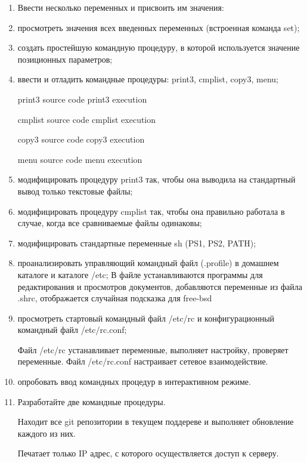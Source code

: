 \documentclass[a4paper,14pt]{article}
\begin{document}


\begin{enumerate}
\item Ввести несколько переменных и присвоить им значения:
	{\small }
\item просмотреть значения всех введенных переменных (встроенная команда set);
	{\small }
\item создать простейшую командную процедуру, в которой используется значение позиционных параметров;
	{\small }
\item ввести и отладить командные процедуры: print3, cmplist, copy3, menu;

	print3 source code
	{\small }
	print3 execution
	{\small }
	
	cmplist source code
	{\small }
	cmplist execution
	{\small }
	
	copy3 source code
	{\small }
	copy3 execution
	{\small }
	
	menu source code
	{\small }
	menu execution
	{\small }
\item модифицировать процедуру print3 так, чтобы она выводила на стандартный вывод только текстовые файлы;
	{\small }
	{\small }
\item модифицировать процедуру cmplist так, чтобы она правильно работала в случае, когда все сравниваемые файлы одинаковы;
	{\small }
	{\small }
\item модифицировать стандартные переменные sh (PS1, PS2, PATH);
	{\small }
\item проанализировать управляющий командный файл (.profile) в домашнем каталоге и каталоге /etc;
	{\small }
	В файле устанавливаются программы для редактирования и просмотров документов, добавляются переменные из файла .shrc, отображается случайная подсказка для free-bsd
\item просмотреть стартовый командный файл /etc/rc и конфигурационный командный файл /etc/rc.conf;

	Файл /etc/rc устанавливает переменные, выполняет настройку, проверяет переменные.
	Файл /etc/rc.conf настраивает сетевое взаимодействие.
\item опробовать ввод командных процедур в интерактивном режиме.
	{\small }
\item Разработайте две командные процедуры.

	Находит все git репозитории в текущем поддереве и выполняет обновление каждого из них.
	{\small }
	{\small }
	
	Печатает только IP адрес, с которого осуществляется доступ к серверу.
	{\small }
	{\small }
\end{enumerate}
\end{document}

